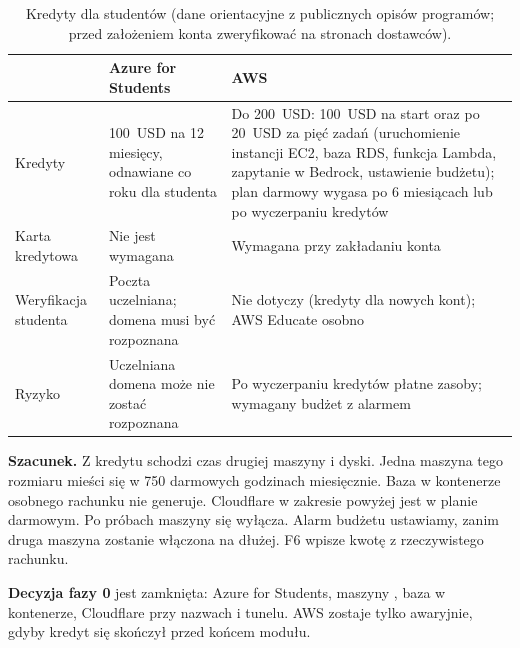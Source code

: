 \begin{table}[H]
\centering\footnotesize
\begin{tabularx}{\textwidth}{@{}lYY@{}}
\toprule
 & \textbf{Azure for Students} & \textbf{AWS} \\
\midrule
Kredyty & 100~USD na 12 miesięcy, odnawiane co roku dla studenta & Do 200~USD: 100~USD na start oraz po 20~USD za pięć zadań (uruchomienie instancji EC2, baza RDS, funkcja Lambda, zapytanie w Bedrock, ustawienie budżetu); plan darmowy wygasa po 6 miesiącach lub po wyczerpaniu kredytów \\
Karta kredytowa & Nie jest wymagana & Wymagana przy zakładaniu konta \\
Weryfikacja studenta & Poczta uczelniana; domena musi być rozpoznana & Nie dotyczy (kredyty dla nowych kont); AWS Educate osobno \\
Ryzyko & Uczelniana domena może nie zostać rozpoznana & Po wyczerpaniu kredytów płatne zasoby; wymagany budżet z alarmem \\
\bottomrule
\end{tabularx}
\caption{Kredyty dla studentów (dane orientacyjne z publicznych opisów programów; przed założeniem konta zweryfikować na stronach dostawców).}
\end{table}

\textbf{Szacunek.} Z kredytu schodzi czas drugiej maszyny i dyski. Jedna maszyna
tego rozmiaru mieści się w 750 darmowych godzinach miesięcznie. Baza w kontenerze
osobnego rachunku nie generuje. Cloudflare w zakresie powyżej jest w planie
darmowym. Po próbach maszyny się wyłącza. Alarm budżetu ustawiamy, zanim druga
maszyna zostanie włączona na dłużej. F6 wpisze kwotę z rzeczywistego rachunku.

\textbf{Decyzja fazy 0} jest zamknięta: Azure for Students, maszyny
, baza w kontenerze, Cloudflare przy nazwach i tunelu.
AWS zostaje tylko awaryjnie, gdyby kredyt się skończył przed końcem modułu.

